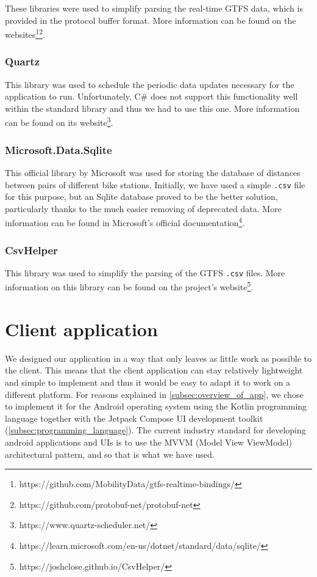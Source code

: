 These libraries were used to simplify parsing the real-time GTFS data, which is provided in the protocol buffer format. More information can be found on the websites\footnote{https://github.com/MobilityData/gtfs-realtime-bindings/}\footnote{https://github.com/protobuf-net/protobuf-net}.

\subsubsection{Quartz}

This library was used to schedule the periodic data updates necessary for the application to run. Unfortunately, C\# does not support this functionality well within the standard library and thus we had to use this one. More information can be found on its website\footnote{https://www.quartz-scheduler.net/}.

\subsubsection{Microsoft.Data.Sqlite}

This official library by Microsoft was used for storing the database of distances between pairs of different bike stations. Initially, we have used a simple \texttt{.csv} file for this purpose, but an Sqlite database proved to be the better solution, particularly thanks to the much easier removing of deprecated data. More information can be found in Microsoft's official documentation\footnote{https://learn.microsoft.com/en-us/dotnet/standard/data/sqlite/}.

\subsubsection{CsvHelper}

This library was used to simplify the parsing of the GTFS \texttt{.csv} files. More information on this library can be found on the project's website\footnote{https://joshclose.github.io/CsvHelper/}.


\section{Client application}

We designed our application in a way that only leaves as little work as possible to the client. This means that the client application can stay relatively lightweight and simple to implement and thus it would be easy to adapt it to work on a different platform. For reasons explained in \cref{subsec:overview_of_app}, we chose to implement it for the Android operating system using the Kotlin programming language together with the Jetpack Compose UI development toolkit (\cref{subsec:programming_language}). The current industry standard for developing android applications and UIs is to use the MVVM (Model View ViewModel) architectural pattern, and so that is what we have used.

